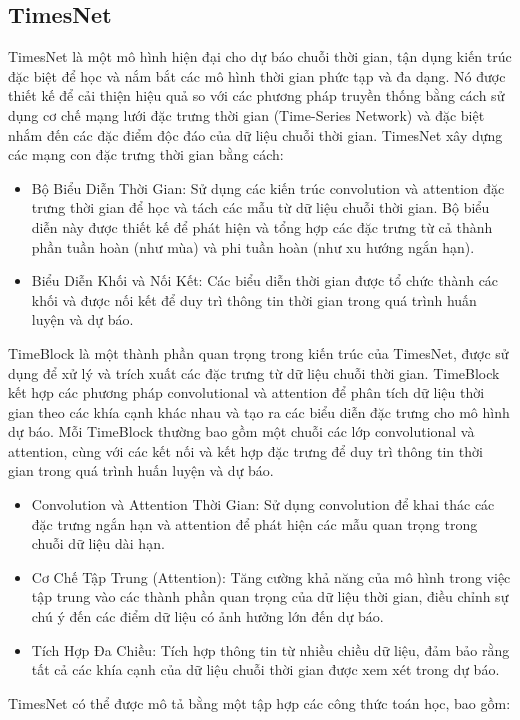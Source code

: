 \documentclass[conference]{IEEEtran}
\begin{document}
	\subsection{TimesNet}
	TimesNet là một mô hình hiện đại cho dự báo chuỗi thời gian, tận dụng kiến trúc đặc biệt để học và nắm bắt các mô hình thời gian phức tạp và đa dạng. Nó được thiết kế để cải thiện hiệu quả so với các phương pháp truyền thống bằng cách sử dụng cơ chế mạng lưới đặc trưng thời gian (Time-Series Network) và đặc biệt nhắm đến các đặc điểm độc đáo của dữ liệu chuỗi thời gian. TimesNet xây dựng các mạng con đặc trưng thời gian bằng cách:
	\begin{itemize}
		\item Bộ Biểu Diễn Thời Gian: Sử dụng các kiến trúc convolution và attention đặc trưng thời gian để học và tách các mẫu từ dữ liệu chuỗi thời gian. Bộ biểu diễn này được thiết kế để phát hiện và tổng hợp các đặc trưng từ cả thành phần tuần hoàn (như mùa) và phi tuần hoàn (như xu hướng ngắn hạn).
		\item Biểu Diễn Khối và Nối Kết: Các biểu diễn thời gian được tổ chức thành các khối và được nối kết để duy trì thông tin thời gian trong quá trình huấn luyện và dự báo.
	\end{itemize}
	TimeBlock là một thành phần quan trọng trong kiến trúc của TimesNet, được sử dụng để xử lý và trích xuất các đặc trưng từ dữ liệu chuỗi thời gian. TimeBlock kết hợp các phương pháp convolutional và attention để phân tích dữ liệu thời gian theo các khía cạnh khác nhau và tạo ra các biểu diễn đặc trưng cho mô hình dự báo.
	Mỗi TimeBlock thường bao gồm một chuỗi các lớp convolutional và attention, cùng với các kết nối và kết hợp đặc trưng để duy trì thông tin thời gian trong quá trình huấn luyện và dự báo. 
	\begin{itemize}
		\item Convolution và Attention Thời Gian: Sử dụng convolution để khai thác các đặc trưng ngắn hạn và attention để phát hiện các mẫu quan trọng trong chuỗi dữ liệu dài hạn.
		\item Cơ Chế Tập Trung (Attention): Tăng cường khả năng của mô hình trong việc tập trung vào các thành phần quan trọng của dữ liệu thời gian, điều chỉnh sự chú ý đến các điểm dữ liệu có ảnh hưởng lớn đến dự báo.
		\item Tích Hợp Đa Chiều: Tích hợp thông tin từ nhiều chiều dữ liệu, đảm bảo rằng tất cả các khía cạnh của dữ liệu chuỗi thời gian được xem xét trong dự báo.
	\end{itemize}
	TimesNet có thể được mô tả bằng một tập hợp các công thức toán học, bao gồm:
\end{document}

